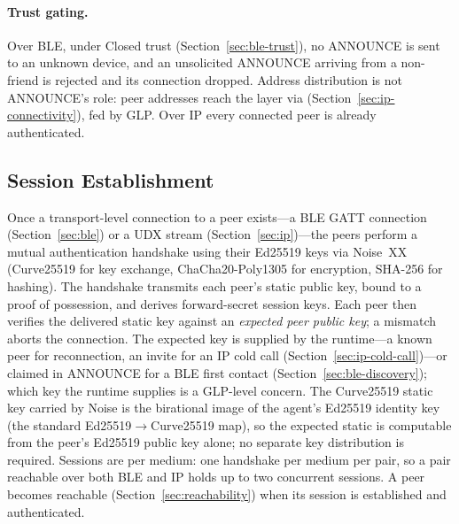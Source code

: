 \paragraph{Trust gating.}
Over BLE, under Closed trust (Section~\ref{sec:ble-trust}), no ANNOUNCE is sent to an unknown device, and an unsolicited ANNOUNCE arriving from a non-friend is rejected and its connection dropped.  Address distribution is not ANNOUNCE's role: peer addresses reach the layer via  (Section~\ref{sec:ip-connectivity}), fed by GLP.  Over IP every connected peer is already authenticated.

\subsection{Session Establishment}
\label{sec:session}
Once a transport-level connection to a peer exists---a BLE GATT connection (Section~\ref{sec:ble}) or a UDX stream (Section~\ref{sec:ip})---the peers perform a mutual authentication handshake using their Ed25519 keys via Noise~XX (Curve25519 for key exchange, ChaCha20-Poly1305 for encryption, SHA-256 for hashing).  The handshake transmits each peer's static public key, bound to a proof of possession, and derives forward-secret session keys.  Each peer then verifies the delivered static key against an \emph{expected peer public key}; a mismatch aborts the connection.  The expected key is supplied by the runtime---a known peer for reconnection, an invite for an IP cold call (Section~\ref{sec:ip-cold-call})---or claimed in ANNOUNCE for a BLE first contact (Section~\ref{sec:ble-discovery}); which key the runtime supplies is a GLP-level concern.  The Curve25519 static key carried by Noise is the birational image of the agent's Ed25519 identity key (the standard Ed25519$\to$Curve25519 map), so the expected static is computable from the peer's Ed25519 public key alone; no separate key distribution is required.  Sessions are per medium: one handshake per medium per pair, so a pair reachable over both BLE and IP holds up to two concurrent sessions.  A peer becomes reachable (Section~\ref{sec:reachability}) when its session is established and authenticated.

